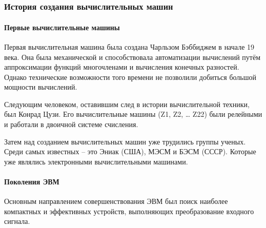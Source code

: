 \chapter{}
\subsection*{История создания вычислительных машин}

\subsubsection*{Первые вычислительные машины}
Первая вычислительная машина была создана  Чарльзом Бэббиджем в начале 19 века. Она была механической и способствовала автоматизации вычислений путём аппроксимации функций многочленами и вычисления конечных разностей. Однако технические возможности того времени не позволили добиться большой мощности вычислений.

Следующим человеком, оставившим след в истории вычислительной техники, был Конрад Цузи. Его вычислительные машины (Z1, Z2, … Z22) были релейными и работали в двоичной системе счисления. 

Затем над созданием вычислительных машин уже трудились группы ученых. Среди самых известных – это Эниак (США), МЭСМ и БЭСМ (СССР). Которые уже являлись электронными вычислительными машинами.

\subsubsection*{Поколения ЭВМ}

Основным направлением совершенствования ЭВМ был поиск наиболее компактных и эффективных устройств, выполняющих преобразование входного сигнала.

